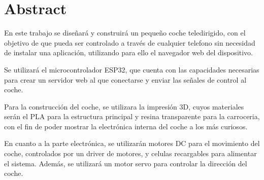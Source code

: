 \section{Abstract}
\hspace{1em} En este trabajo se diseñará y construirá un pequeño coche 
teledirigido, con el objetivo de que pueda ser controlado a través de
cualquier telefono sin necesidad de instalar una aplicación,
utilizando para ello el navegador web del dispositivo.

Se utilizará el microcontrolador ESP32, que cuenta con las 
capacidades necesarias para crear un servidor web al que conectarse
y enviar las señales de control al coche.

Para la construcción del coche, se utilizara la impresión 3D, cuyos materiales 
serán el PLA para la estructura principal y resina transparente para
la carroceria, con el fin de poder mostrar la electrónica interna del 
coche a los más curiosos.

En cuanto a la parte electrónica, se utilizarán motores DC para el movimiento
del coche, controlados por un driver de motores, y celulas recargables para
alimentar el sistema. Además, se utilizará un motor servo para controlar 
la dirección del coche.



